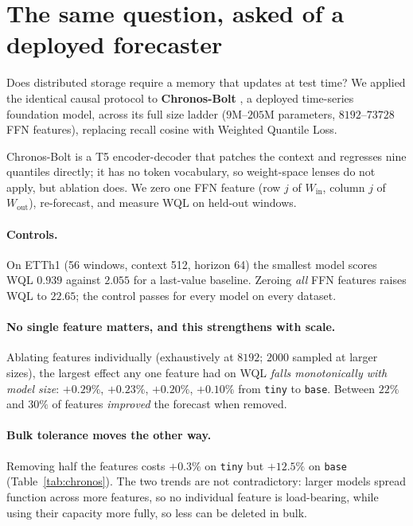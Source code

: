 \documentclass{article}
\begin{document}
\section{The same question, asked of a deployed forecaster}

Does distributed storage require a memory that updates at test time? We applied the
identical causal protocol to \textbf{Chronos-Bolt} \citep{ansari2024chronos}, a deployed
time-series foundation model, across its full size ladder ($9$M--$205$M parameters,
$8192$--$73728$ FFN features), replacing recall cosine with Weighted Quantile Loss.

Chronos-Bolt is a T5 encoder-decoder that patches the context and regresses nine quantiles
directly; it has no token vocabulary, so weight-space lenses do not apply, but ablation
does. We zero one FFN feature (row $j$ of $W_{\text{in}}$, column $j$ of $W_{\text{out}}$),
re-forecast, and measure WQL on held-out windows.

\paragraph{Controls.} On ETTh1 (56 windows, context 512, horizon 64) the smallest model
scores WQL $0.939$ against $2.055$ for a last-value baseline. Zeroing \emph{all} FFN
features raises WQL to $22.65$; the control passes for every model on every dataset.

\paragraph{No single feature matters, and this strengthens with scale.} Ablating features
individually (exhaustively at $8192$; $2000$ sampled at larger sizes), the largest effect
any one feature had on WQL \emph{falls monotonically with model size}: $+0.29\%$, $+0.23\%$,
$+0.20\%$, $+0.10\%$ from \texttt{tiny} to \texttt{base}. Between $22\%$ and $30\%$ of
features \emph{improved} the forecast when removed.

\paragraph{Bulk tolerance moves the other way.} Removing half the features costs $+0.3\%$
on \texttt{tiny} but $+12.5\%$ on \texttt{base} (Table~\ref{tab:chronos}). The two trends
are not contradictory: larger models spread function across more features, so no individual
feature is load-bearing, while using their capacity more fully, so less can be deleted in
bulk.
\end{document}
